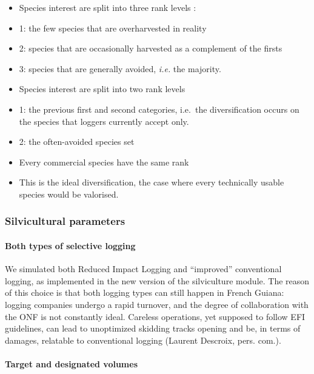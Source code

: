 \documentclass[12pt,]{article}
\providecommand{\tightlist}{%
\setlength{\itemsep}{0pt}\setlength{\parskip}{0pt}}
\theoremstyle{definition}
\theoremstyle{definition}
\theoremstyle{definition}
\theoremstyle{remark}
\begin{document}
\begin{itemize}
\tightlist
\item
  Species interest are split into three rank levels :
\item
  1: the few species that are overharvested in reality
\item
  2: species that are occasionally harvested as a complement of the
  firsts
\item
  3: species that are generally avoided, \emph{i.e.} the majority.
\item
  Species interest are split into two rank levels
\item
  1: the previous first and second categories, i.e.~the diversification
  occurs on the species that loggers currently accept only.
\item
  2: the often-avoided species set
\item
  Every commercial species have the same rank
\item
  This is the ideal diversification, the case where every technically
  usable species would be valorised.
\end{itemize}

\subsubsection{Silvicultural parameters}\label{silvicultural-parameters}

\paragraph{Both types of selective
logging}\label{both-types-of-selective-logging}

We simulated both Reduced Impact Logging and ``improved'' conventional
logging, as implemented in the new version of the silviculture module.
The reason of this choice is that both logging types can still happen in
French Guiana: logging companies undergo a rapid turnover, and the
degree of collaboration with the ONF is not constantly ideal. Careless
operations, yet supposed to follow EFI guidelines, can lead to
unoptimized skidding tracks opening and be, in terms of damages,
relatable to conventional logging (Laurent Descroix, pers. com.).

\paragraph{Target and designated
volumes}\label{target-and-designated-volumes}
\end{document}
